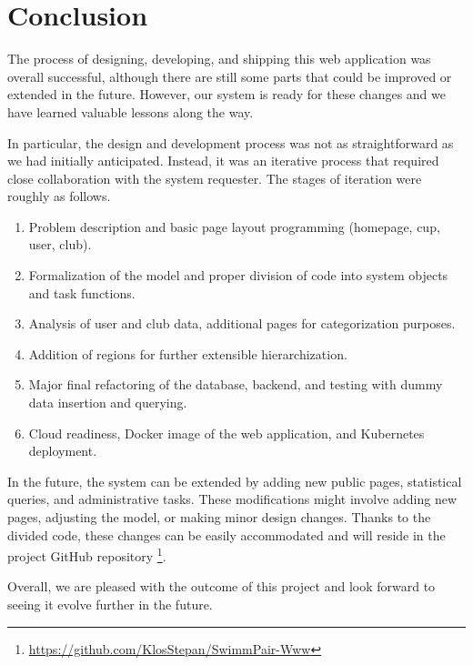 \chapter*{Conclusion}
The process of designing, developing, and shipping this web application was overall successful, although there are still some parts that could be improved or extended in the future. However, our system is ready for these changes and we have learned valuable lessons along the way.

In particular, the design and development process was not as straightforward as we had initially anticipated. Instead, it was an iterative process that required close collaboration with the system requester. The stages of iteration were roughly as follows.

\begin{enumerate}
\item Problem description and basic page layout programming (homepage, cup, user, club).
\item Formalization of the model and proper division of code into system objects and task functions.
\item Analysis of user and club data, additional pages for categorization purposes.
\item Addition of regions for further extensible hierarchization.
\item Major final refactoring of the database, backend, and testing with dummy data insertion and querying.
\item Cloud readiness, Docker image of the web application, and Kubernetes deployment.
\end{enumerate}

In the future, the system can be extended by adding new public pages, statistical queries, and administrative tasks. These modifications might involve adding new pages, adjusting the model, or making minor design changes. Thanks to the divided code, these changes can be easily accommodated and will reside in the project GitHub repository \footnote{\url{https://github.com/KlosStepan/SwimmPair-Www}}.

Overall, we are pleased with the outcome of this project and look forward to seeing it evolve further in the future.

